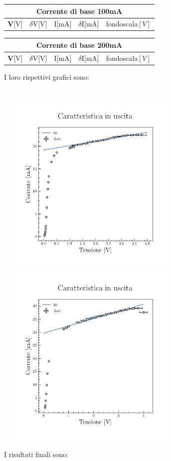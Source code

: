 \documentclass{amsart}
\begin{document}
    \begin{center}
        \begin{tabular}{|p{1cm}|p{1cm}|p{1cm}|p{1cm}|p{2cm}|}
            \hline
            \multicolumn{5}{|c|}{Corrente di base 100mA}\\
            \hline
            \textbf V[V] & $\delta$V[V] & I[mA] & $\delta$I[mA] & fondoscala$[V]$ \\
            \hline
            
            \hline      
        \end{tabular}
        \hspace{1cm}
        \begin{tabular}{|p{1cm}|p{1cm}|p{1cm}|p{1cm}|p{2cm}|}
            \hline
            \multicolumn{5}{|c|}{Corrente di base 200mA}\\
            \hline
            \textbf V[V] & $\delta$V[V] & I[mA] & $\delta$I[mA]  & fondoscala$[V]$ \\
            \hline
            
            \hline
        \end{tabular}
    \end{center}
    I loro rispettivi grafici sono:\\
    \hfill \\
    \begin{center}
        \includegraphics[width = 9cm, height = 9cm]{ib100/grafico_transistor.png}
        \hspace{0.1cm}
        \includegraphics[width = 9cm, height = 9cm]{ib200/grafico_transistor.png}
    \end{center}
    I risultati finali sono:\\
\end{document}
